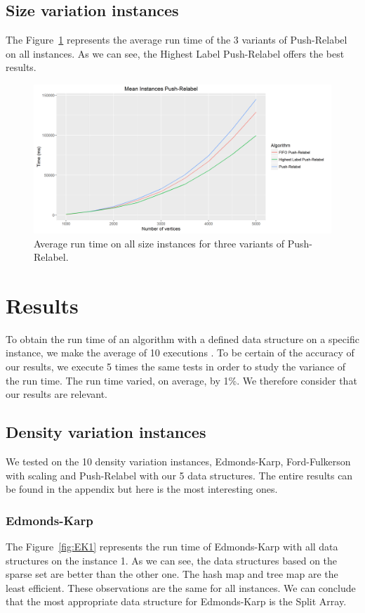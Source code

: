 \subsection{Size variation instances}
The Figure~\ref{fig:PRsize} represents the average run time of the 3 variants of Push-Relabel on all instances. As we can see, the Highest Label Push-Relabel offers the best results.

\begin{figure}[H]
\includegraphics[scale=0.5]{images/meanPRsize.png}
\caption{Average run time on all size instances for three variants of Push-Relabel.}
\label{fig:PRsize}
\end{figure}

\section{Results}
To obtain the run time of an algorithm with a defined data structure on a specific instance, we make the average of 10 executions	. To be certain of the accuracy of our results, we execute 5 times the same tests in order to study the variance of the run time. The run time varied, on average, by 1\%. We therefore consider that our results are relevant.

\subsection{Density variation instances}
We tested on the 10 density variation instances, Edmonds-Karp, Ford-Fulkerson with scaling and Push-Relabel with our 5 data structures. The entire results can be found in the appendix but here is the most interesting ones.

\subsubsection{Edmonds-Karp}
The Figure~\ref{fig:EK1} represents the run time of Edmonds-Karp with all data structures on the instance 1. As we can see, the data structures based on the sparse set are better than the other one. The hash map and tree map are the least efficient. These observations are the same for all instances. We can conclude that the most appropriate data structure for Edmonds-Karp is the Split Array.

